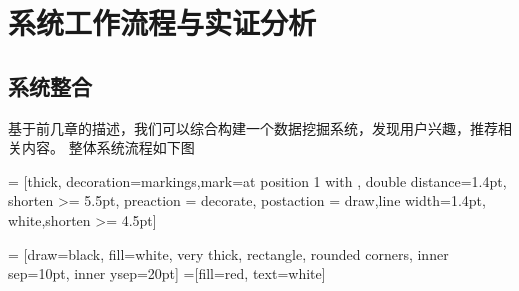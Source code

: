 \chapter{系统工作流程与实证分析}
\section{系统整合}
基于前几章的描述，我们可以综合构建一个数据挖掘系统，发现用户兴趣，推荐相关内容。
整体系统流程如下图

\usetikzlibrary{shapes,snakes}
\usetikzlibrary{arrows, decorations.markings}

 = [thick, decoration={markings,mark=at position
   1 with {}},
   double distance=1.4pt, shorten >= 5.5pt,
   preaction = {decorate},
   postaction = {draw,line width=1.4pt, white,shorten >= 4.5pt}]

 = [draw=black, fill=white, very thick,
    rectangle, rounded corners, inner sep=10pt, inner ysep=20pt]
 =[fill=red, text=white]

\def\html{
    \draw[rounded corners=0.1ex,fill=white,thick] (0.2,0.2) rectangle (1.2,1.5);
    \draw[rounded corners=0.1ex,fill=white,thick] (0.1,0.1) rectangle (1.1,1.4);
    \draw[rounded corners=0.1ex,fill=white,thick] (0,0) rectangle (1,1.3);
    \node at (0.5,0.3) {\tiny HTML};
}


